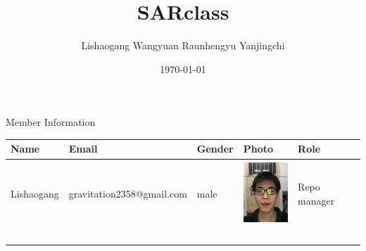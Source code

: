 \documentclass[24pt]{article}%
\title{SARclass}
\author{Lishaogang Wangyuan Raunhengyu Yanjingchi}
\date{\today}
\begin{document}
	
	\maketitle
	
	\title{}  Member Information
	
	\begin{table}[h]
		\begin{center}  
			\begin{tabular}{|l|l|l|l|l|}  
				\hline  
				Name & Email & Gender & Photo & Role \\ \hline  
				Lishaogang& gravitation2358@gmail.com & male & \includegraphics[width=18mm, height=24mm]{lishaogang.jpg} & Repo manager \\ 
				&&&&\\ \hline
				&&&&\\ \hline
				&&&&\\ \hline
				&&&&\\ \hline
			
			\end{tabular}  
		\end{center}  
	\end{table}  

	
	
	
	
\end{document}
